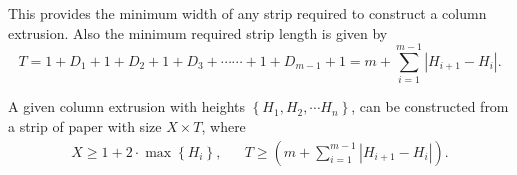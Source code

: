 This provides the minimum width of any strip required to construct a column extrusion.
Also the minimum required strip length is given by
$$ T = 1 + D_1  +  1 + D_2  +  1 + D_3  +\cdots\cdots +  1 + D_{m-1}  +  1 = m + \sum^{m-1}_{i=1} \left| H_{i+1}-H_i\right|. $$

\begin{theorem}
\label{thm:column_extrusion}
A given column extrusion with heights $\left\{ H_1, H_2,\cdots H_n \right\}$, can be constructed from a strip of paper with size
$X\times T$, where
\begin{align*}
X\ge 1 + 2\cdot\max\left\{ H_i\right\}, && T \ge \left( m + \sum\limits^{m-1}_{i=1} \left| H_{i+1}-H_i\right|\right).
\end{align*}
\end{theorem}
